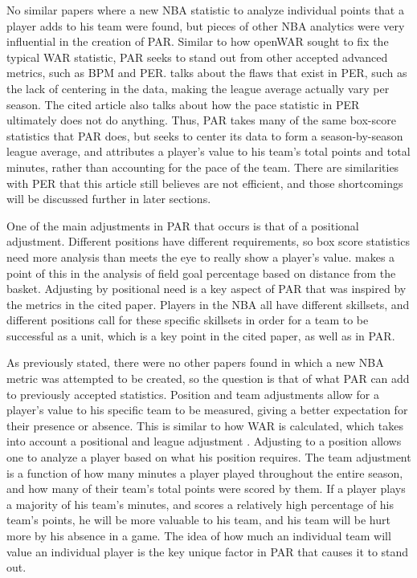\documentclass[titlepage, 12pt]{article}
\begin{document}
No similar papers where a new NBA statistic to analyze individual points 
that a player adds to his team were found, but pieces of other NBA 
analytics were very influential in the creation of PAR. Similar to how 
openWAR sought to fix the typical WAR statistic, PAR seeks to stand out 
from other accepted advanced metrics, such as BPM and PER. 
\citet{Hamalian} talks about the flaws that exist in PER, such as the lack 
of centering in the data, making the league average actually vary per 
season. The cited article also talks about how the pace statistic in PER 
ultimately does not do anything. Thus, PAR takes many of the same 
box-score 
statistics that PAR does, but seeks to center its data to form a 
season-by-season league average, and attributes a player's value to his 
team's total points and total minutes, rather than accounting for the pace 
of the team. There are similarities with PER that this article still believes 
are not efficient, and those shortcomings will be discussed further in later 
sections.

One of the main adjustments in PAR that occurs is that of a positional 
adjustment. Different positions have different requirements, so box score 
statistics need more analysis than meets the eye to really show a player's 
value. \citet{Piette} makes a point of this in the analysis of field goal 
percentage based on distance from the basket. Adjusting by positional 
need is a key aspect of PAR that was inspired by the metrics in the cited 
paper. Players in the NBA all have different skillsets, and different 
positions call for these specific skillsets in order for a team to be 
successful as a unit, which is a key point in the cited paper, as well as in 
PAR.

As previously stated, there were no other papers found in which a new 
NBA metric was attempted to be created, so the question is that of what 
PAR can add to previously accepted statistics.
Position and team adjustments 
allow for a player's value to his 
specific team to be measured, giving a better expectation for their 
presence or absence. This is similar to how WAR is calculated, which 
takes into account a positional and league adjustment 
\citep{BaseballWAR}. Adjusting to a 
position allows one to analyze a player based on what his position 
requires. The team adjustment is a function of how 
many minutes a player played 
throughout the entire season, and how many of their team's total points 
were scored by them. If a player 
plays a majority of his team's minutes, and scores a relatively high 
percentage of his team's points, he will 
be more valuable to his team, and his team will be hurt more by his 
absence in a game. The idea of how much an individual team will value 
an individual player is the key unique factor in PAR that causes it to stand 
out.
\end{document}
